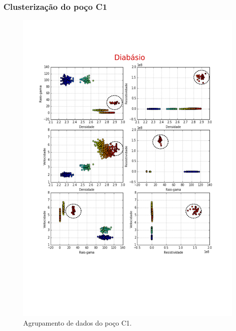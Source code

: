 \documentclass[aspectratio=10]{beamer} %
\begin{document}
\begin{frame}
\frametitle{Clusterização do poço C1}
\begin{figure}[H]
\centering
\includegraphics[scale=0.3]{Imagens/diabasioC1.png}
\caption{Agrupamento de dados do poço C1.}
\end{figure} 
\end{frame}
\end{document}
